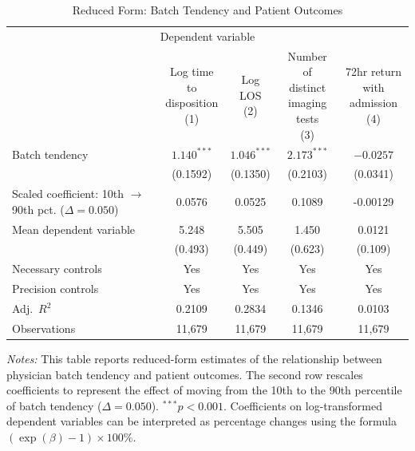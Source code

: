 \documentclass[,,blindrev]{informs}
\begin{document}
\begin{table}[t!]
\centering
\caption{Reduced Form: Batch Tendency and Patient Outcomes}
\label{tab:red_form}
\begin{threeparttable}
\begin{tabular}{p{5cm}cccc}
\toprule
\multicolumn{5}{c}{Dependent variable} \\
\cmidrule(lr){2-5}
& \makecell[c]{Log time to \\ disposition\\(1)} 
& \makecell[c]{Log \\ LOS\\(2)} 
& \makecell[c]{Number of \\ distinct \\ imaging tests\\(3)} 
& \makecell[c]{72hr return \\ with admission\\(4)} \\
\midrule
Batch tendency  
& $1.140^{***}$ & $1.046^{***}$ & $2.173^{***}$ & $-0.0257$ \\ 
& (0.1592) & (0.1350) & (0.2103) & (0.0341) \\[0.75em]

\makecell[l]{Scaled coefficient:\\ 10th $\rightarrow$ 90th pct. ($\Delta = 0.050$)}  
& 0.0576 & 0.0525 & 0.1089 & -0.00129 \\[1em]

Mean dependent variable 
& 5.248 & 5.505 & 1.450 & 0.0121 \\ 
& (0.493) & (0.449) & (0.623) & (0.109) \\ 

Necessary controls & Yes & Yes & Yes & Yes \\ 
Precision controls & Yes & Yes & Yes & Yes \\ 
\midrule
Adj.\ $R^2$ & 0.2109 & 0.2834 & 0.1346 & 0.0103 \\ 
Observations & 11{,}679 & 11{,}679 & 11{,}679 & 11{,}679 \\
\bottomrule
\end{tabular}

\begin{flushleft}
\footnotesize
\textit{Notes:} This table reports reduced-form estimates of the relationship between physician batch tendency and patient outcomes. 
The second row rescales coefficients to represent the effect of moving from the 10th to the 90th percentile of batch tendency ($\Delta = 0.050$).
$^{***} p < 0.001$.
Coefficients on log-transformed dependent variables can be interpreted as percentage changes using the formula $(\exp(\beta) - 1) \times 100\%$.
\end{flushleft}

\end{threeparttable}
\end{table}
\end{document}
